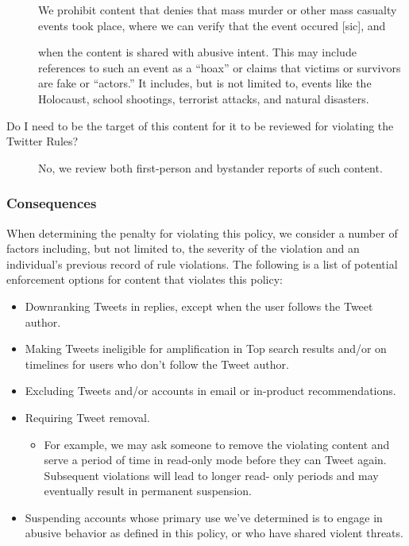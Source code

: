 \begin{description}
    We prohibit content that denies that mass murder or other mass casualty
    events took place, where we can verify that the event occured [sic], and

    when the content is shared with abusive intent. This may include references
    to such an event as a ``hoax'' or claims that victims or survivors are fake
    or ``actors.'' It includes, but is not limited to, events like the
    Holocaust, school shootings, terrorist attacks, and natural disasters.

\item[Do I need to be the target of this content for it to be reviewed for
    violating the Twitter Rules?] \hfill

    No, we review both first-person and bystander reports of such content.
\end{description}


\subsubsection{Consequences}

When determining the penalty for violating this policy, we consider a number of
factors including, but not limited to, the severity of the violation and an
individual's previous record of rule violations. The following is a list of
potential enforcement options for content that violates this policy:

\begin{itemize}
\item Downranking Tweets in replies, except when the user follows the Tweet
    author.
\item Making Tweets ineligible for amplification in Top search results and/or on
    timelines for users who don't follow the Tweet author.
\item Excluding Tweets and/or accounts in email or in-product recommendations.
\item Requiring Tweet removal.
    \begin{itemize}
    \item For example, we may ask someone to remove the violating content and
        serve a period of time in read-only mode before they can Tweet again.
        Subsequent violations will lead to longer read- only periods and may
        eventually result in permanent suspension.
    \end{itemize}
\item Suspending accounts whose primary use we've determined is to engage in
    abusive behavior as defined in this policy, or who have shared violent
    threats.
\end{itemize}

